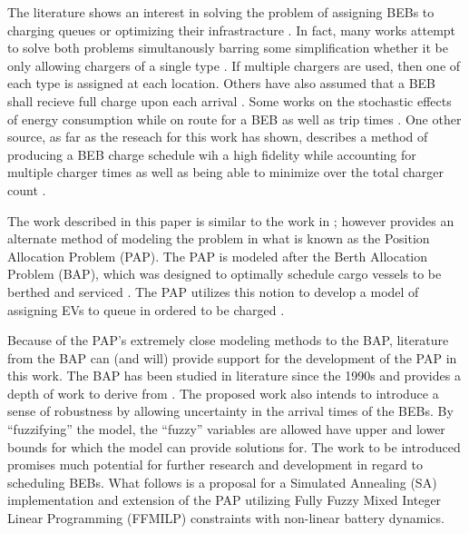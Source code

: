 \documentclass[ee,msthesis]{usuthesis}
\begin{document}
The literature shows an interest in solving the problem of assigning BEBs to charging queues or optimizing their
infrastracture \cite{wei-2018-optim-spatio,sebastiani-2016-evaluat-elect,hoke-2014-accoun-lithium,wang-2017-elect-vehic}. In fact, many works attempt to solve both problems simultanously
barring some simplification whether it be only allowing chargers of a single type
\cite{he-2020-optim-charg,tang-2019-robus-sched}. If multiple chargers are used, then one of each type is assigned at
each location. Others have also assumed that a BEB shall recieve full charge upon each arrival
\cite{wei-2018-optim-spatio,wang-2017-elect-vehic,zhou-2020-bi-objec,wang-2017-optim-rechar}. Some works on the
stochastic effects of energy consumption while on route for a BEB as well as trip times \cite{zhou-2020-collab-optim,bie-2021-optim-elect}. One other source, as far as the reseach for this work has shown, describes a method of producing
a BEB charge schedule wih a high fidelity while accounting for multiple charger times as well as being able to minimize
over the total charger count \cite{whitaker-2023-a-network}.

The work described in this paper is similar to the work in \cite{whitaker-2023-a-network}; however provides an
alternate method of modeling the problem in what is known as the Position Allocation Problem (PAP). The PAP is modeled
after the Berth Allocation Problem (BAP), which was designed to optimally schedule cargo vessels to be berthed and
serviced \cite{buhrkal-2011-model-discr,imai-2001-dynam-berth,frojan-2015-contin-berth}. The PAP utilizes this
notion to develop a model of assigning EVs to queue in ordered to be charged \cite{qarebagh-2019-optim-sched}.

Because of the PAP's extremely close modeling methods to the BAP, literature from the BAP can (and will) provide support
for the development of the PAP in this work. The BAP has been studied in literature since the 1990s and provides a depth
of work to derive from \cite{rodrigues-2022-berth}. The proposed work also intends to introduce a sense of robustness
by allowing uncertainty in the arrival times of the BEBs. By ``fuzzifying'' the model, the ``fuzzy'' variables are allowed
have upper and lower bounds for which the model can provide solutions for. The work to be introduced promises much
potential for further research and development in regard to scheduling BEBs. What follows is a proposal for a Simulated
Annealing (SA) implementation and extension of the PAP utilizing Fully Fuzzy Mixed Integer Linear Programming (FFMILP)
constraints with non-linear battery dynamics.
\end{document}
